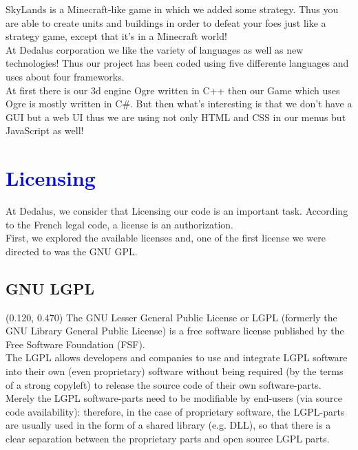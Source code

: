 \documentclass[article]{report}         %
\begin{document}
      SkyLands is a Minecraft-like game in which we added some strategy. Thus you are able to create units and buildings in order to defeat your foes just like a strategy game, except that it's in a Minecraft world!\\

      At Dedalus corporation we like the variety of languages as well as new technologies! Thus our project has been coded using five differente languages and uses about four frameworks.\\
      At first there is our 3d engine Ogre written in C++ then our Game which uses Ogre is mostly written in C#. But then what's interesting is that we don't have a GUI but a web UI thus we are using not only HTML and CSS in our menus but JavaScript as well!

        \chapter{\textcolor{blue}{Licensing}}
          At Dedalus, we consider that Licensing our code is an important task. According to the French legal code, a license is an authorization.\\
          First, we explored the available licenses and, one of the first license we were directed to was the GNU GPL.

          \section{GNU LGPL}
            \begin{textblock}{0.475}(0.120, 0.470)
              The GNU Lesser General Public License or LGPL (formerly the GNU Library General Public License) is a free software license published by the Free Software Foundation (FSF). \\
              The LGPL allows developers and companies to use and integrate LGPL software into their own (even proprietary) software without being required (by the terms of a strong copyleft) to release the source code of their own software-parts. Merely the LGPL software-parts need to be modifiable by end-users (via source code availability): therefore, in the case of proprietary software, the LGPL-parts are usually used in the form of a shared library (e.g. DLL), so that there is a clear separation between the proprietary parts and open source LGPL parts.\\
          \end{textblock}
\end{document}
